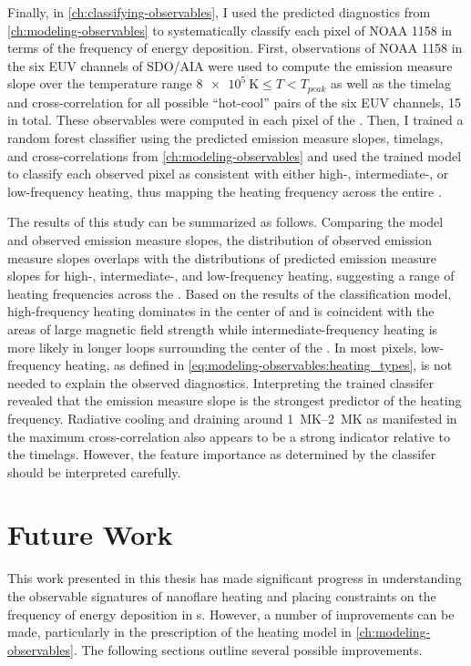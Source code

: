 Finally, in \autoref{ch:classifying-observables}, I used the predicted diagnostics from \autoref{ch:modeling-observables} to systematically classify each pixel of \AR{} NOAA 1158 in terms of the frequency of energy deposition. First, observations of NOAA 1158 in the six EUV channels of SDO/AIA were used to compute the emission measure slope over the temperature range $\SI{8e5}{\kelvin}\le T < T_{peak}$ as well as the timelag and cross-correlation for all possible ``hot-cool'' pairs of the six EUV channels, 15 in total. These observables were computed in each pixel of the \AR{}. Then, I trained a random forest classifier using the predicted emission measure slopes, timelags, and cross-correlations from \autoref{ch:modeling-observables} and used the trained model to classify each observed pixel as consistent with either high-, intermediate-, or low-frequency heating, thus mapping the heating frequency across the entire \AR{}.

The results of this study can be summarized as follows. Comparing the model and observed emission measure slopes, the distribution of observed emission measure slopes overlaps with the distributions of predicted emission measure slopes for high-, intermediate-, and low-frequency heating, suggesting a range of heating frequencies across the \AR{}. Based on the results of the classification model, high-frequency heating dominates in the center of \AR{} and is coincident with the areas of large magnetic field strength while intermediate-frequency heating is more likely in longer loops surrounding the center of the \AR{}. In most pixels, low-frequency heating, as defined in \autoref{eq:modeling-observables:heating_types}, is not needed to explain the observed diagnostics. Interpreting the trained classifer revealed that the emission measure slope is the strongest predictor of the heating frequency. Radiative cooling and draining around \SIrange{1}{2}{\mega\kelvin} as manifested in the maximum cross-correlation also appears to be a strong indicator relative to the timelags. However, the feature importance as determined by the classifer should be interpreted carefully.

\section{Future Work}\label{sec:future-work}

This work presented in this thesis has made significant progress in understanding the observable signatures of nanoflare heating and placing constraints on the frequency of energy deposition in \AR s. However, a number of improvements can be made, particularly in the prescription of the heating model in \autoref{ch:modeling-observables}. The following sections outline several possible improvements.

